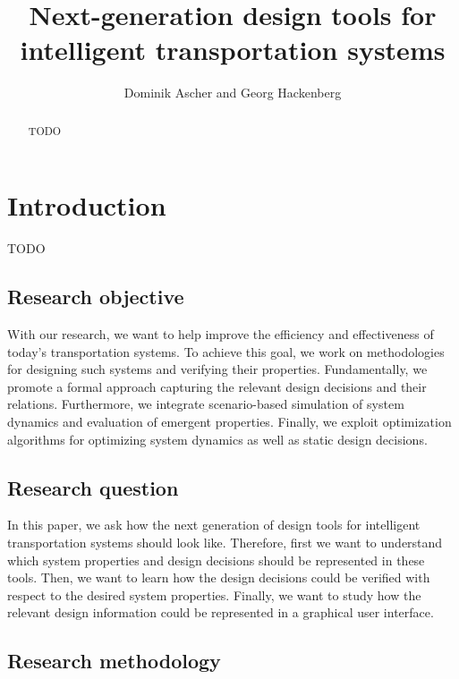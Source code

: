 \documentclass[10pt,twocolumn]{article}
\begin{document}
\title{Next-generation design tools for intelligent transportation systems}
\author{Dominik Ascher and Georg Hackenberg}
\maketitle

\begin{abstract}
    TODO
\end{abstract}

\section{Introduction}
\label{sec:introduction}

TODO~\cite{ascher_hackenberg_2014,ascher_hackenberg_2015,ascher_hackenberg_2016,ascher_hackenberg_2017}

\subsection{Research objective}

With our research, we want to help improve the efficiency and effectiveness of today's transportation systems.
To achieve this goal, we work on methodologies for designing such systems and verifying their properties.
Fundamentally, we promote a formal approach capturing the relevant design decisions and their relations.
Furthermore, we integrate scenario-based simulation of system dynamics and evaluation of emergent properties.
Finally, we exploit optimization algorithms for optimizing system dynamics as well as static design decisions.

\subsection{Research question}

In this paper, we ask how the next generation of design tools for intelligent transportation systems should look like.
Therefore, first we want to understand which system properties and design decisions should be represented in these tools.
Then, we want to learn how the design decisions could be verified with respect to the desired system properties.
Finally, we want to study how the relevant design information could be represented in a graphical user interface.

\subsection{Research methodology}
\end{document}
